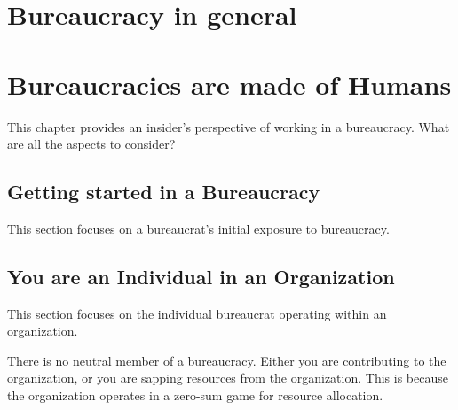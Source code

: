 \documentclass{book}
\begin{document}
\chapter{Bureaucracy in general}
   \clearpage
   \clearpage
  
  
  \clearpage
   \clearpage
   \clearpage
   \clearpage
   \clearpage

\chapter{Bureaucracies are made of Humans\label{b_made_of_humans}}

This chapter provides an insider's perspective of working in a bureaucracy. What are all the aspects to consider?

  \section{Getting started in a Bureaucracy}
    This section focuses on a bureaucrat's initial exposure to bureaucracy. 
  
    
    
    
    
    
    
    
  \newpage
  \section{You are an Individual in an Organization}
  
    This section focuses on the individual bureaucrat operating within an organization. 
    
    There is no neutral member of a bureaucracy. Either you are contributing to the organization, or you are sapping resources from the organization. This is because the organization operates in a zero-sum game for resource allocation.
    
    
    
    
  \newpage
    
    
    
    
    
  \newpage
\end{document}
